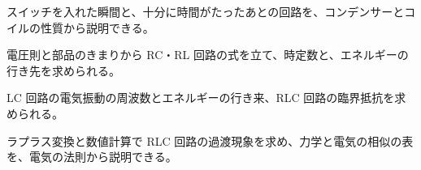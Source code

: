 \begin{furikaeri}
\begin{checklist}
\item スイッチを入れた瞬間と、十分に時間がたったあとの回路を、コンデンサーとコイルの性質から説明できる。
\item 電圧則と部品のきまりから RC・RL 回路の式を立て、時定数と、エネルギーの行き先を求められる。
\item LC 回路の電気振動の周波数とエネルギーの行き来、RLC 回路の臨界抵抗を求められる。
\item ラプラス変換と数値計算で RLC 回路の過渡現象を求め、力学と電気の相似の表を、電気の法則から説明できる。
\end{checklist}
\end{furikaeri}
